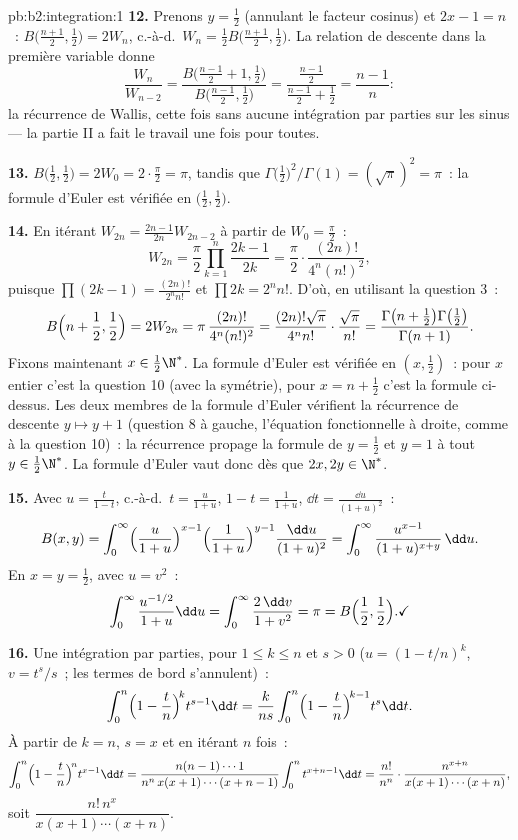 \begin{solution}{pb:b2:integration:1}
\textbf{12.} Prenons $y = \frac12$ (annulant le facteur cosinus) et
$2x - 1 = n$~: $B\bigl(\frac{n+1}2, \frac12\bigr) = 2W_n$, c.-à-d.\
$W_n = \frac12 B\bigl(\frac{n+1}2,\frac12\bigr)$. La relation de descente
dans la première variable donne
\[
\frac{W_n}{W_{n-2}}
= \frac{B\bigl(\frac{n-1}2 + 1, \frac12\bigr)}
{B\bigl(\frac{n-1}2, \frac12\bigr)}
= \frac{\frac{n-1}2}{\frac{n-1}2 + \frac12}
= \frac{n-1}{n} :
\]
la récurrence de Wallis, cette fois sans aucune intégration par parties
sur les sinus --- la partie II a fait le travail une fois pour toutes.

\textbf{13.} $B\bigl(\frac12,\frac12\bigr) = 2W_0 =
2\cdot\frac\pi2 = \pi$, tandis que
$\Gamma\bigl(\frac12\bigr)^2/\Gamma(1) = (\sqrt\pi)^2 = \pi$~:
la formule d'Euler est vérifiée en $\bigl(\frac12,\frac12\bigr)$.

\textbf{14.} En itérant $W_{2n} = \frac{2n-1}{2n}W_{2n-2}$ à partir de
$W_0 = \frac\pi2$~:
\[
W_{2n} = \frac\pi2\prod_{k=1}^{n}\frac{2k-1}{2k}
= \frac\pi2\cdot\frac{(2n)!}{4^n(n!)^2},
\]
puisque $\prod(2k-1) = \frac{(2n)!}{2^n n!}$ et $\prod 2k = 2^n
n!$. D'où, en utilisant la question 3~:
\[
B\Bigl(n+\frac12, \frac12\Bigr) = 2W_{2n}
= \pi\,\frac{(2n)!}{4^n(n!)^2}
= \frac{(2n)!\sqrt\pi}{4^n n!}\cdot\frac{\sqrt\pi}{n!}
= \frac{\Gamma\bigl(n+\frac12\bigr)\Gamma\bigl(\frac12\bigr)}
{\Gamma(n+1)} .
\]
Fixons maintenant $x \in \frac12\N^*$. La formule d'Euler est vérifiée en $(x,
\frac12)$~: pour $x$ entier c'est la question 10 (avec la symétrie),
pour $x = n + \frac12$ c'est la formule ci-dessus. Les deux membres de
la formule d'Euler vérifient la récurrence de descente $y \mapsto y + 1$
(question 8 à gauche, l'équation fonctionnelle à droite,
comme à la question 10)~: la récurrence propage la formule de $y =
\frac12$ et $y = 1$ à tout $y \in \frac12\N^*$. La formule d'Euler
vaut donc dès que $2x, 2y \in \N^*$.

\textbf{15.} Avec $u = \frac{t}{1-t}$, c.-à-d.\ $t =
\frac{u}{1+u}$, $1 - t = \frac{1}{1+u}$, $\dd t =
\frac{\dd u}{(1+u)^2}$~:
\[
B(x,y) = \int_0^\infty
\Bigl(\frac{u}{1+u}\Bigr)^{x-1}
\Bigl(\frac{1}{1+u}\Bigr)^{y-1}
\frac{\dd u}{(1+u)^2}
= \int_0^\infty \frac{u^{x-1}}{(1+u)^{x+y}}\,\dd u .
\]
En $x = y = \frac12$, avec $u = v^2$~:
\[
\int_0^\infty \frac{u^{-1/2}}{1+u}\dd u
= \int_0^\infty \frac{2\,\dd v}{1+v^2} = \pi
= B\Bigl(\frac12,\frac12\Bigr) . \checkmark
\]

\textbf{16.} Une intégration par parties, pour $1 \leq k \leq n$
et $s > 0$ ($u = (1 - t/n)^k$, $v = t^s/s$~; les termes de bord
s'annulent)~:
\[
\int_0^n \Bigl(1-\frac tn\Bigr)^{\!k} t^{s-1}\dd t
= \frac{k}{ns}\int_0^n \Bigl(1-\frac tn\Bigr)^{\!k-1}
t^{s}\dd t .
\]
À partir de $k = n$, $s = x$ et en itérant $n$ fois~:
\[
\int_0^n \Bigl(1-\frac tn\Bigr)^{\!n} t^{x-1}\dd t
= \frac{n(n-1)\cdots1}{n^n\,x(x+1)\cdots(x+n-1)}
\int_0^n t^{x+n-1}\dd t
= \frac{n!}{n^n}\cdot
\frac{n^{x+n}}{x(x+1)\cdots(x+n)} ,
\]
soit $\dfrac{n!\,n^x}{x(x+1)\cdots(x+n)}$.


\end{solution}
